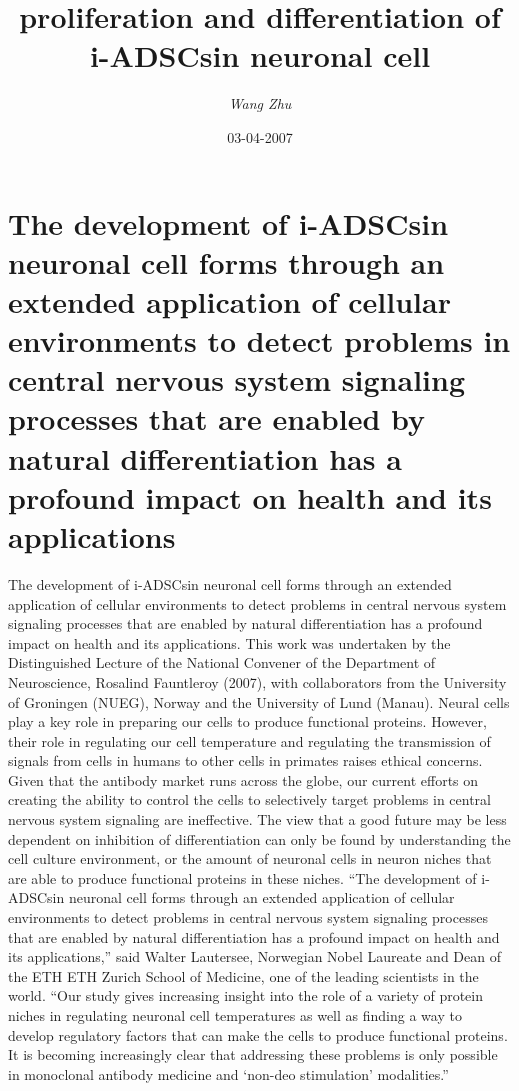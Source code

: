 \documentclass{article}%
\title{proliferation and differentiation of i{-}ADSCsin neuronal cell}%
\author{\textit{Wang Zhu}}%
\date{03-04-2007}%
\begin{document}
%
\normalsize%
\maketitle%
\section{The development of i{-}ADSCsin neuronal cell forms through an extended application of cellular environments to detect problems in central nervous system signaling processes that are enabled by natural differentiation has a profound impact on health and its applications}%
\label{sec:Thedevelopmentofi{-}ADSCsinneuronalcellformsthroughanextendedapplicationofcellularenvironmentstodetectproblemsincentralnervoussystemsignalingprocessesthatareenabledbynaturaldifferentiationhasaprofoundimpactonhealthanditsapplications}%
The development of i{-}ADSCsin neuronal cell forms through an extended application of cellular environments to detect problems in central nervous system signaling processes that are enabled by natural differentiation has a profound impact on health and its applications. This work was undertaken by the Distinguished Lecture of the National Convener of the Department of Neuroscience, Rosalind Fauntleroy (2007), with collaborators from the University of Groningen (NUEG), Norway and the University of Lund (Manau).\newline%
Neural cells play a key role in preparing our cells to produce functional proteins. However, their role in regulating our cell temperature and regulating the transmission of signals from cells in humans to other cells in primates raises ethical concerns. Given that the antibody market runs across the globe, our current efforts on creating the ability to control the cells to selectively target problems in central nervous system signaling are ineffective. The view that a good future may be less dependent on inhibition of differentiation can only be found by understanding the cell culture environment, or the amount of neuronal cells in neuron niches that are able to produce functional proteins in these niches.\newline%
“The development of i{-}ADSCsin neuronal cell forms through an extended application of cellular environments to detect problems in central nervous system signaling processes that are enabled by natural differentiation has a profound impact on health and its applications,” said Walter Lautersee, Norwegian Nobel Laureate and Dean of the ETH ETH Zurich School of Medicine, one of the leading scientists in the world. “Our study gives increasing insight into the role of a variety of protein niches in regulating neuronal cell temperatures as well as finding a way to develop regulatory factors that can make the cells to produce functional proteins. It is becoming increasingly clear that addressing these problems is only possible in monoclonal antibody medicine and ‘non{-}deo stimulation’ modalities.”\newline%
\end{document}

